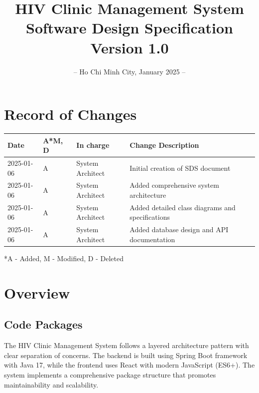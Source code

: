 \documentclass[12pt,a4paper]{article}
\title{
    \vspace{-2cm}
    \Huge\textbf{HIV Clinic Management System}\\
    \vspace{1cm}
    \Large\textbf{Software Design Specification}\\
    \vspace{2cm}
    \normalsize Version 1.0
}
\author{}
\date{
    \vspace{4cm}
    – Ho Chi Minh City, January 2025 –
}
\begin{document}
\maketitle
\thispagestyle{empty}

\newpage

\section*{Record of Changes}
\begin{longtable}{|p{3cm}|p{2cm}|p{3cm}|p{6cm}|}
\hline
\textbf{Date} & \textbf{A*M, D} & \textbf{In charge} & \textbf{Change Description} \\
\hline
2025-01-06 & A & System Architect & Initial creation of SDS document \\
\hline
2025-01-06 & A & System Architect & Added comprehensive system architecture \\
\hline
2025-01-06 & A & System Architect & Added detailed class diagrams and specifications \\
\hline
2025-01-06 & A & System Architect & Added database design and API documentation \\
\hline
\end{longtable}

\footnotesize{*A - Added, M - Modified, D - Deleted}

\newpage

\tableofcontents

\newpage

\section{Overview}

\subsection{Code Packages}

The HIV Clinic Management System follows a layered architecture pattern with clear separation of concerns. The backend is built using Spring Boot framework with Java 17, while the frontend uses React with modern JavaScript (ES6+). The system implements a comprehensive package structure that promotes maintainability and scalability.
\end{document}
